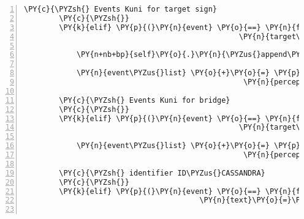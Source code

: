 \begin{Verbatim}[commandchars=\\\{\},numbers=left,firstnumber=1,stepnumber=1]
        \PY{c}{\PYZsh{} Events Kuni for target sign}
        \PY{c}{\PYZsh{}}
        \PY{k}{elif} \PY{p}{(}\PY{n}{event} \PY{o}{==} \PY{n}{fabula}\PY{o}{.}\PY{n}{TriesToLookAtEvent}\PY{p}{(}\PY{n}{identifier}\PY{o}{=}\PY{n}{ID\PYZus{}KUNI}\PY{p}{,}
                                                 \PY{n}{target\PYZus{}identifier}\PY{o}{=}\PY{l+s}{\PYZsq{}}\PY{l+s}{sign}\PY{l+s}{\PYZsq{}}\PY{p}{)}\PY{p}{)}\PY{p}{:}

            \PY{n+nb+bp}{self}\PY{o}{.}\PY{n}{\PYZus{}append\PYZus{}sentence}\PY{p}{(}\PY{n}{ID\PYZus{}KUNI}\PY{p}{,} \PY{l+s}{\PYZsq{}}\PY{l+s}{Auf dem Schild an der Brücke steht Überfliegen erlaubt!}\PY{l+s}{\PYZsq{}}\PY{p}{)}

            \PY{n}{event\PYZus{}list} \PY{o}{+}\PY{o}{=} \PY{p}{[}\PY{n}{fabula}\PY{o}{.}\PY{n}{PerceptionEvent}\PY{p}{(}\PY{n}{identifier}\PY{o}{=}\PY{n}{ID\PYZus{}KUNI}\PY{p}{,}
                                                  \PY{n}{perception}\PY{o}{=}\PY{l+s}{\PYZsq{}}\PY{l+s}{Brücke gesperrt! Betreten verboten, Überfliegen erlaubt!}\PY{l+s}{\PYZsq{}}\PY{p}{)}\PY{p}{]}

        \PY{c}{\PYZsh{} Events Kuni for bridge}
        \PY{c}{\PYZsh{}}
        \PY{k}{elif} \PY{p}{(}\PY{n}{event} \PY{o}{==} \PY{n}{fabula}\PY{o}{.}\PY{n}{TriesToLookAtEvent}\PY{p}{(}\PY{n}{identifier}\PY{o}{=}\PY{n}{ID\PYZus{}KUNI}\PY{p}{,}
                                                 \PY{n}{target\PYZus{}identifier}\PY{o}{=}\PY{l+s}{\PYZsq{}}\PY{l+s}{bridge}\PY{l+s}{\PYZsq{}}\PY{p}{)}\PY{p}{)}\PY{p}{:}

            \PY{n}{event\PYZus{}list} \PY{o}{+}\PY{o}{=} \PY{p}{[}\PY{n}{fabula}\PY{o}{.}\PY{n}{PerceptionEvent}\PY{p}{(}\PY{n}{identifier}\PY{o}{=}\PY{n}{ID\PYZus{}KUNI}\PY{p}{,}
                                                  \PY{n}{perception}\PY{o}{=}\PY{l+s}{\PYZsq{}}\PY{l+s}{Abflugsort über die Brücke. Leider kann ich nicht fliegen.}\PY{l+s}{\PYZsq{}}\PY{p}{)}\PY{p}{]}

        \PY{c}{\PYZsh{} identifier ID\PYZus{}CASSANDRA}
        \PY{c}{\PYZsh{}}
        \PY{k}{elif} \PY{p}{(}\PY{n}{event} \PY{o}{==} \PY{n}{fabula}\PY{o}{.}\PY{n}{SaysEvent}\PY{p}{(}\PY{n}{identifier}\PY{o}{=}\PY{n}{ID\PYZus{}CASSANDRA}\PY{p}{,}
                                        \PY{n}{text}\PY{o}{=}\PY{l+s}{\PYZsq{}}\PY{l+s}{Guten Tag, ich bin die Fee Cassandra.}\PY{l+s}{\PYZsq{}}\PY{p}{)}\PY{p}{)}\PY{p}{:}


\end{Verbatim}
